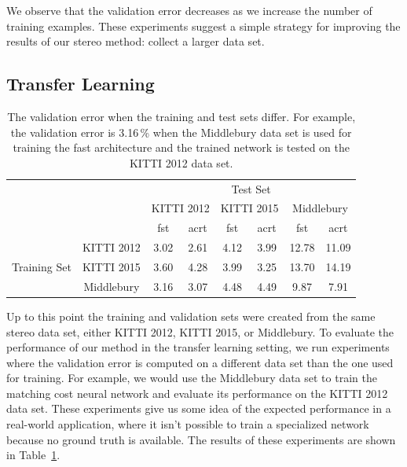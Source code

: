 \documentclass[twoside,11pt]{article}
\begin{document}
We observe that the validation error decreases as we increase the number of
training examples. These experiments suggest a simple strategy for improving the
results of our stereo method: collect a larger data set.

\subsection{Transfer Learning}

\begin{table}[tb]
\begin{center}
\begin{tabular}{cc cccccc}
\toprule
&& \multicolumn{6}{c}{Test Set} \\\cmidrule(lr){3-8}
&& \multicolumn{2}{c}{KITTI 2012} & \multicolumn{2}{c}{KITTI 2015} & \multicolumn{2}{c}{Middlebury} \\
\cmidrule(lr){3-4}
\cmidrule(lr){5-6}
\cmidrule(lr){7-8}
&& fst & acrt & fst & acrt & fst & acrt\\\midrule
\multirow{3}{*}{Training Set} 
& KITTI 2012 & 3.02 & 2.61 & 4.12 & 3.99 & 12.78 & 11.09 \\
& KITTI 2015 & 3.60 & 4.28 & 3.99 & 3.25 & 13.70 & 14.19 \\
& Middlebury & 3.16 & 3.07 & 4.48 & 4.49 & 9.87 & 7.91  \\
\bottomrule
\end{tabular}
\caption{The validation error when the training and test sets differ. For
example, the validation error is 3.16\,\% when the Middlebury data set is used
for training the fast architecture and the trained network is tested on the
KITTI 2012 data set.}

\label{tbl:transfer}
\end{center}
\end{table}

Up to this point the training and validation sets were created from the same
stereo data set, either KITTI 2012, KITTI 2015, or Middlebury. To evaluate the
performance of our method in the transfer learning setting, we run experiments
where the validation error is computed on a different data set than the one
used for training. For example, we would use the Middlebury data set to train
the matching cost neural network and evaluate its performance on the KITTI 2012
data set. These experiments give us some idea of the expected performance in a
real-world application, where it isn't possible to train a specialized network
because no ground truth is available. The results of these experiments are
shown in Table~\ref{tbl:transfer}.
\end{document}

